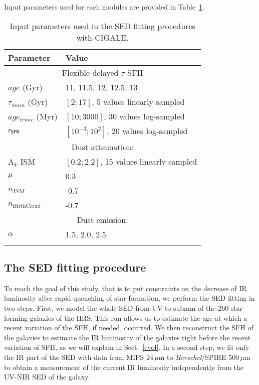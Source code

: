 \documentclass[traditabstract]{aa} %
\begin{document}
Input parameters used for each modules are provided in Table~\ref{inputparam}.



\begin{table}
   \centering
   \caption{Input parameters used in the SED fitting procedures with CIGALE.}
   \begin{tabular}{l  l }
   \hline\hline
   Parameter & Value \\ 
   \hline\hline
   \multicolumn{2}{c}{Flexible delayed-$\tau$ SFH}\\  
   \hline
   $age$ (Gyr) &  11, 11.5, 12, 12.5, 13        \\
   $\tau_{main}$  (Gyr) & $[2;17]$, 5 values linearly sampled\\
   $age_{trunc}$ (Myr) & $[10;3000]$, 30 values log-sampled\\
   $r_{\rm{SFR}}$  & $[10^{-3};10^{2}]$, 20 values log-sampled     \\ 
   \hline\hline
   \multicolumn{2}{c}{Dust attenuation: \cite{CharlotFall00}}\\  
   \hline
   A$_V$ ISM      &  $[0.2;2.2]$, 15 values linearly sampled\\
   $\mu$      &  0.3\\
   $n_{ISM}$ & -0.7 \\
   $n_{\mathrm{Birth Cloud}}$ & -0.7 \\
   \hline\hline
   \multicolumn{2}{c}{Dust emission: \cite{Dale14}}\\  
   \hline
   $\alpha$      &  1.5, 2.0, 2.5\\
   \hline
   \hline
   \label{inputparam}
   \end{tabular}
\end{table}

\subsection{The SED fitting procedure}
To reach the goal of this study, that is to put constraints on the decrease of IR luminosity after rapid quenching of star formation, we perform the SED fitting in two steps.
First, we model the whole SED from UV to submm of the 260 star-forming galaxies of the HRS.
This run allows us to estimate the age at which a recent variation of the SFH, if needed, occurred.
We then reconstruct the SFH of the galaxies to estimate the IR luminosity of the galaxies right before the recent variation of SFH, as we will explain in Sect.~\ref{evol}.
In a second step, we fit only the IR part of the SED with data from MIPS 24\,$\mu$m to \textit{Herschel}/SPIRE 500\,$\mu$m to obtain a measurement of the current IR luminosity independently from the UV-NIR SED of the galaxy.
\end{document}
